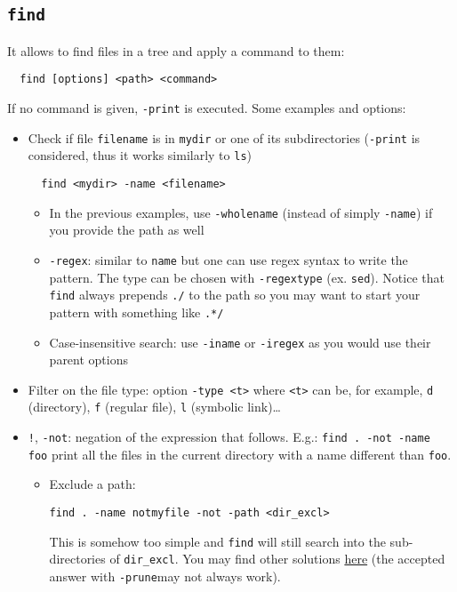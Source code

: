 \documentclass[a4paper,12pt,%
              final%
              ]{article}
\begin{document}
\subsection{\texttt{find}}
It allows to find files in a tree and apply a command to them:
\begin{verbatim}
  find [options] <path> <command>
\end{verbatim}
If no command is given, \texttt{-print} is executed. Some examples and options:
\begin{itemize}
  \item Check if file \texttt{filename} is in \texttt{mydir} or one of its subdirectories (\texttt{-print} is considered, thus it works similarly to \texttt{ls})
\begin{verbatim}
  find <mydir> -name <filename>
\end{verbatim}
  \begin{itemize}
    \item In the previous examples, use \verb|-wholename| (instead of simply \verb|-name|) if you provide the path as well
    \item \verb|-regex|: similar to \texttt{name} but one can use regex syntax to write the pattern. The type can be chosen with \verb|-regextype| (ex. \texttt{sed}). Notice that \texttt{find} always prepends \verb|./| to the path so you may want to start your pattern with something like \verb|.*/|
    \item Case-insensitive search: use \verb|-iname| or \verb|-iregex| as you would use their parent options
  \end{itemize}
  \item Filter on the file type: option \verb|-type <t>| where \texttt{<t>} can be, for example, \texttt{d} (directory), \texttt{f} (regular file), \texttt{l} (symbolic link)\dots
  \item \texttt{!}, \texttt{-not}: negation of the expression that follows. E.g.: \texttt{find . -not -name foo} print all the files in the current directory with a name different than \texttt{foo}.
    \begin{itemize}
      \item Exclude a path:
\begin{verbatim}
find . -name notmyfile -not -path <dir_excl>
\end{verbatim}
        This is somehow too simple and \texttt{find} will still search into the sub-directories of \verb|dir_excl|. You may find other solutions \href{https://stackoverflow.com/questions/4210042/how-to-exclude-a-directory-in-find-command}{here} (the accepted answer with \verb|-prune|may not always work).

\end{itemize}
\end{itemize}
\end{document}
